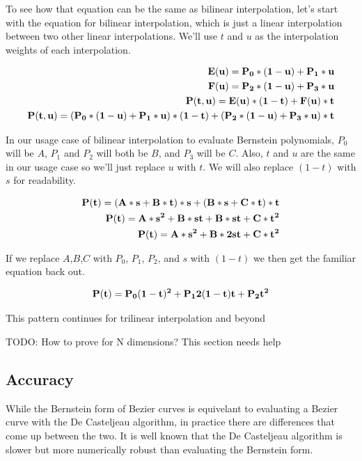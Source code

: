 \documentclass{jcgt}
\begin{document}
To see how that equation can be the same as bilinear interpolation, let's start with the equation for bilinear interpolation, which is just a linear interpolation between two other linear interpolations.  We'll use $t$ and $u$ as the interpolation weights of each interpolation.

\begin{equation}
\begin{split}
\bf{E(u)} = P_0*(1-u) + P_1*u \\
\bf{F(u)} = P_2*(1-u) + P_3*u \\
\bf{P(t,u)} = E(u)*(1-t) + F(u)*t \\
\bf{P(t,u)} = (P_0*(1-u) + P_1*u)*(1-t) + (P_2*(1-u) + P_3*u)*t
\end{split}
\label{eqn:bilinearinterpolation}
\end{equation}

In our usage case of bilinear interpolation to evaluate Bernstein polynomials, $P_0$ will be $A$, $P_1$ and $P_2$ will both be $B$, and $P_3$ will be $C$.  Also, $t$ and $u$ are the same in our usage case so we'll just replace $u$ with $t$.  We will also replace $(1-t)$ with $s$ for readability.

\begin{equation}
\begin{split}
\bf{P(t)} = (A*s+B*t)*s + (B*s+C*t)*t \\
\bf{P(t)} = A*s^2+B*st + B*st+C*t^2 \\
\bf{P(t)} = A*s^2+B*2st+C*t^2
\end{split}
\label{eqn:bilinearinterpolation2}
\end{equation}

If we replace $A$,$B$,$C$ with $P_0$, $P_1$, $P_2$, and $s$ with $(1-t)$ we then get the familiar equation back out.

\begin{equation}
\bf{P(t)} = P_0(1-t)^2+P_12(1-t)t+P_2t^2
\label{eqn:bilinearinterpolation3}
\end{equation}

This pattern continues for trilinear interpolation and beyond

TODO: How to prove for N dimensions?  This section needs help

\subsection{Accuracy}

While the Bernstein form of Bezier curves is equivelant to evaluating a Bezier curve with the De Casteljeau algorithm, in practice there are differences that come up between the two.  It is well known that the De Casteljeau algorithm is slower but more numerically robust than evaluating the Bernstein form.
\end{document}
